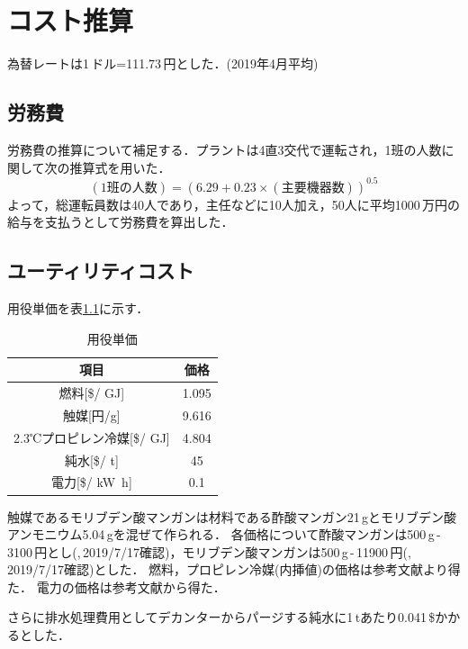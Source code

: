 \documentclass[a4j]{jsreport}
\begin{document}
\appendix
\chapter{コスト推算}
為替レートは1\,ドル=111.73\,円とした．(2019年4月平均)

\section{労務費}
労務費の推算について補足する．プラントは4直3交代で運転され，1班の人数に関して次の推算式を用いた．
\begin{equation}
    (1班の人数) = (6.29 + 0.23 \times (主要機器数))^{0.5}
\end{equation}
よって，総運転員数は40人であり，主任などに10人加え，50人に平均1000\,万円の給与を支払うとして労務費を算出した．

\section{ユーティリティコスト}
用役単価を表\ref{用役単価}に示す．
\begin{table}[htbp]
  \centering
  \caption{用役単価}
  \label{用役単価}
  \begin{tabular}{cc}
    \hline
    項目 & 価格 \\
    \hline
    燃料[\$/ \si{\giga \joule}] & 1.095 \\
    触媒[円/g] & 9.616 \\
    2.3℃プロピレン冷媒[\$/ \si{\giga \joule}] & 4.804 \\
    純水[\$/ \si{\tonne}] & 45 \\
    電力[\$/ \si{\kilo \watt \hour}] & 0.1 \\
    \hline
  \end{tabular}
\end{table}
触媒であるモリブデン酸マンガンは材料である酢酸マンガン21\,gとモリブデン酸アンモニウム5.04\,gを混ぜて作られる\cite{Li2019}．
各価格について酢酸マンガンは500\,g\,-\,3100\,円とし(\cite{酢酸マンガン},\,2019/7/17確認)，モリブデン酸マンガンは500\,g\,-\,11900\,円(\cite{モリブデン酸アンモニウム},\,2019/7/17確認)とした．
燃料，プロピレン冷媒(内挿値)の価格は参考文献\cite{プロセスデザインコンテスト10}より得た．
電力の価格は参考文献\cite{講義資料3}から得た．

さらに排水処理費用としてデカンターからパージする純水に1\,\si{\tonne}あたり0.041\,\$かかるとした\cite{講義資料3}．
\end{document}

